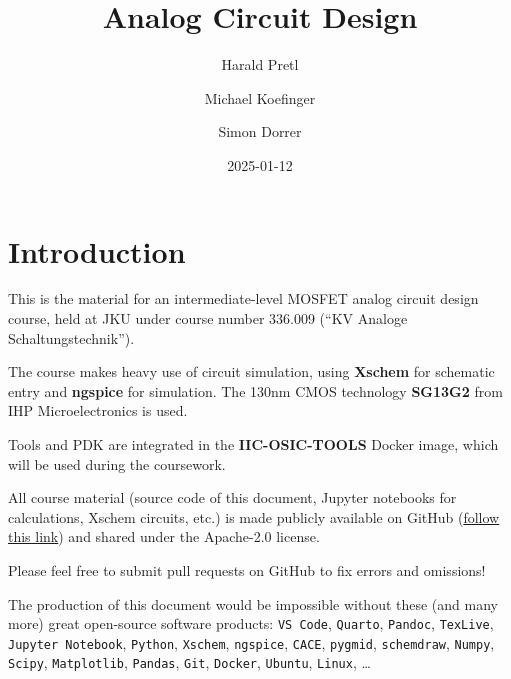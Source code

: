 \documentclass[
  a4paper,
  DIV=11,
  numbers=noendperiod]{scrartcl}
\title{Analog Circuit Design}
\author{Harald Pretl \and Michael Koefinger \and Simon Dorrer}
\date{2025-01-12}
\renewcommand*\contentsname{Table of contents}
\newcommand\contentsname{Table of contents}
\begin{document}
\maketitle

\renewcommand*\contentsname{Table of contents}
{
\hypersetup{linkcolor=}
\setcounter{tocdepth}{3}
\tableofcontents
}

\section{Introduction}\label{sec-intro}

This is the material for an intermediate-level MOSFET analog circuit
design course, held at JKU under course number 336.009 (``KV Analoge
Schaltungstechnik'').

The course makes heavy use of circuit simulation, using \textbf{Xschem}
for schematic entry and \textbf{ngspice} for simulation. The 130nm CMOS
technology \textbf{SG13G2} from IHP Microelectronics is used.

Tools and PDK are integrated in the \textbf{IIC-OSIC-TOOLS} Docker
image, which will be used during the coursework.

\begin{tcolorbox}[enhanced jigsaw, colframe=quarto-callout-important-color-frame, opacityback=0, title=\textcolor{quarto-callout-important-color}{\faExclamation}\hspace{0.5em}{Important}, bottomtitle=1mm, breakable, toprule=.15mm, colbacktitle=quarto-callout-important-color!10!white, rightrule=.15mm, arc=.35mm, toptitle=1mm, coltitle=black, bottomrule=.15mm, leftrule=.75mm, titlerule=0mm, colback=white, opacitybacktitle=0.6, left=2mm]

All course material (source code of this document, Jupyter notebooks for
calculations, Xschem circuits, etc.) is made publicly available on
GitHub (\href{https://github.com/iic-jku/analog-circuit-design}{follow
this link}) and shared under the Apache-2.0 license.

Please feel free to submit pull requests on GitHub to fix errors and
omissions!

The production of this document would be impossible without these (and
many more) great open-source software products: \texttt{VS\ Code},
\texttt{Quarto}, \texttt{Pandoc}, \texttt{TexLive},
\texttt{Jupyter\ Notebook}, \texttt{Python}, \texttt{Xschem},
\texttt{ngspice}, \texttt{CACE}, \texttt{pygmid}, \texttt{schemdraw},
\texttt{Numpy}, \texttt{Scipy}, \texttt{Matplotlib}, \texttt{Pandas},
\texttt{Git}, \texttt{Docker}, \texttt{Ubuntu}, \texttt{Linux}, \ldots{}

\end{tcolorbox}
\end{document}
